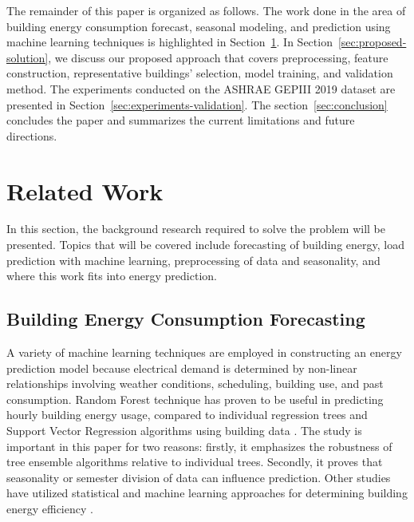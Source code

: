 \documentclass[conference]{IEEEtran}
\begin{document}
The remainder of this paper is organized as follows. The work done in the
area of building energy consumption forecast, seasonal modeling, and
prediction using machine learning techniques is highlighted in
Section~\ref{sec:related-work}. In Section~\ref{sec:proposed-solution}, we
discuss our proposed approach that covers preprocessing, feature
construction, representative buildings' selection, model training, and
validation method. The experiments conducted on the ASHRAE GEPIII 2019
dataset are presented in Section~\ref{sec:experiments-validation}. The section~\ref{sec:conclusion} concludes the paper and summarizes the current limitations
and future directions.




\section{Related Work}
\label{sec:related-work}

In this section, the background research required to solve the problem will be presented.
Topics that will be covered include forecasting of building energy, load prediction with machine learning, preprocessing of data and seasonality, and where this work fits into energy prediction.


\subsection{Building Energy Consumption Forecasting}

A variety of machine learning techniques are employed in constructing an
energy prediction model because electrical demand is determined by non-linear
relationships involving weather conditions, scheduling, building use, and past
consumption. Random Forest technique has proven to be useful in predicting
hourly building energy usage, compared to individual regression trees and
Support Vector Regression algorithms using building data \cite{Wang2018RFHourly}.
The study is important in this paper for two reasons: firstly, it emphasizes the
robustness of tree ensemble algorithms relative to individual trees. Secondly, it
proves that seasonality or semester division of data can influence prediction.
Other studies have utilized statistical and machine learning approaches for
determining building energy efficiency \cite{Tsanas2012EnergyBuild}.
\end{document}

